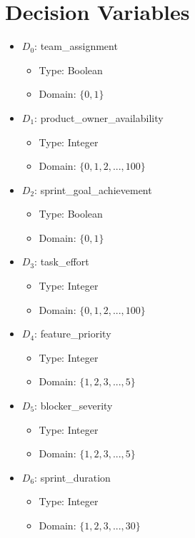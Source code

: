 \documentclass{article}
\begin{document}
\section{Decision Variables}
\begin{itemize}
    \item $D_0$: team\_assignment
        \begin{itemize}
            \item Type: Boolean
            \item Domain: $\{0,1\}$
        \end{itemize}
    \item $D_1$: product\_owner\_availability
        \begin{itemize}
            \item Type: Integer
            \item Domain: $\{0,1,2,...,100\}$
        \end{itemize}
    \item $D_2$: sprint\_goal\_achievement
        \begin{itemize}
            \item Type: Boolean
            \item Domain: $\{0,1\}$
        \end{itemize}
    \item $D_3$: task\_effort
        \begin{itemize}
            \item Type: Integer
            \item Domain: $\{0,1,2,...,100\}$
        \end{itemize}
    \item $D_4$: feature\_priority
        \begin{itemize}
            \item Type: Integer
            \item Domain: $\{1,2,3,...,5\}$
        \end{itemize}
    \item $D_5$: blocker\_severity
        \begin{itemize}
            \item Type: Integer
            \item Domain: $\{1,2,3,...,5\}$
        \end{itemize}
    \item $D_6$: sprint\_duration
        \begin{itemize}
            \item Type: Integer
            \item Domain: $\{1,2,3,...,30\}$

\end{itemize}
\end{itemize}
\end{document}
